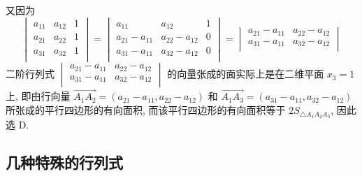 \begin{solution}
\begin{figure}[H]
\begin{tikzpicture}[x=0.75pt,y=0.75pt,yscale=-1,xscale=1]
        \end{tikzpicture}
        \caption{}
        \label{sjiehanglsyouxtji}
    \end{figure}
    又因为 $$\begin{vmatrix} a_{11} & a_{12} & 1 \\ a_{21} & a_{22} & 1 \\ a_{31} & a_{32} & 1 \\\end{vmatrix}=\begin{vmatrix} a_{11} & a_{12} & 1 \\ a_{21}-a_{11} & a_{22}-a_{12} & 0 \\ a_{31}-a_{11} & a_{32}-a_{12} & 0 \\\end{vmatrix}=\begin{vmatrix} a_{21}-a_{11} & a_{22}-a_{12} \\ a_{31}-a_{11} & a_{32}-a_{12} \\\end{vmatrix}$$
    二阶行列式 $\begin{vmatrix} a_{21}-a_{11} & a_{22}-a_{12} \\ a_{31}-a_{11} & a_{32}-a_{12} \\\end{vmatrix}$ 的向量张成的面实际上是在二维平面 $x_3=1$ 上, 
    即由行向量 $\overrightarrow{A_1A_2} =( a_{21}-a_{11} , a_{22}-a_{12} )$ 和 $\overrightarrow{A_1A_3} =(a_{31}-a_{11} , a_{32}-a_{12} )$ 所张成的平行四边形的有向面积, 而该平行四边形的有向面积等于 $2S_{\bigtriangleup A_1A_2A_3}$, 因此选 D.
\end{solution}

\subsection{几种特殊的行列式}


